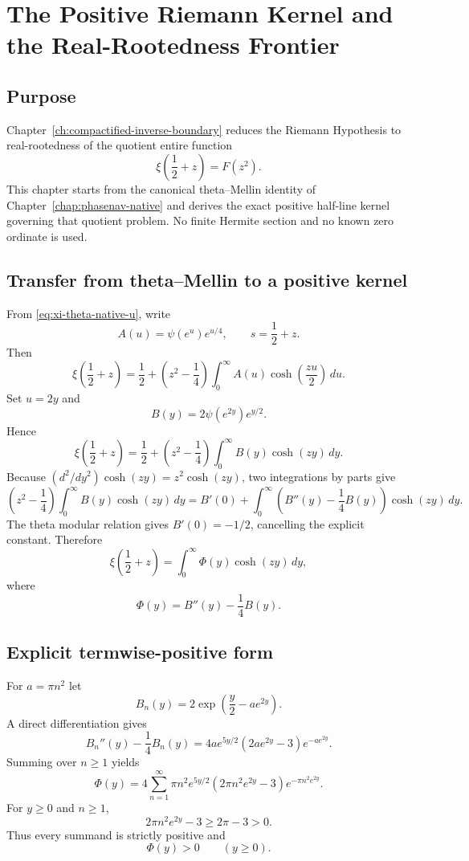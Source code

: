 \chapter{The Positive Riemann Kernel and the Real-Rootedness Frontier}
\label{chap:positive-riemann-kernel}


\section{Purpose}

Chapter~\ref{ch:compactified-inverse-boundary} reduces the Riemann Hypothesis to real-rootedness of the quotient entire function
\[
 \xi\!\left(\frac12+z\right)=F(z^2).
\]
This chapter starts from the canonical theta--Mellin identity of Chapter~\ref{chap:phasenav-native} and derives the exact positive half-line kernel governing that quotient problem. No finite Hermite section and no known zero ordinate is used.

\section{Transfer from theta--Mellin to a positive kernel}

From \cref{eq:xi-theta-native-u}, write
\[
 A(u)=\psi(e^u)e^{u/4},
 \qquad s=\frac12+z.
\]
Then
\[
 \xi\!\left(\frac12+z\right)
 =\frac12+\left(z^2-\frac14\right)
 \int_0^\infty A(u)\cosh\!\left(\frac{zu}{2}\right)\,du.
\]
Set $u=2y$ and
\[
 B(y)=2\psi(e^{2y})e^{y/2}.
\]
Hence
\[
 \xi\!\left(\frac12+z\right)
 =\frac12+\left(z^2-\frac14\right)
 \int_0^\infty B(y)\cosh(zy)\,dy.
\]
Because $(d^2/dy^2)\cosh(zy)=z^2\cosh(zy)$, two integrations by parts give
\[
 \left(z^2-\frac14\right)
 \int_0^\infty B(y)\cosh(zy)\,dy
 =B'(0)+\int_0^\infty
 \left(B''(y)-\frac14B(y)\right)\cosh(zy)\,dy.
\]
The theta modular relation gives $B'(0)=-1/2$, cancelling the explicit constant. Therefore
\begin{equation}
 \boxed{
 \xi\!\left(\frac12+z\right)
 =\int_0^\infty \Phi(y)\cosh(zy)\,dy,
 }
 \label{eq:positive-riemann-kernel}
\end{equation}
where
\[
 \Phi(y)=B''(y)-\frac14B(y).
\]

\section{Explicit termwise-positive form}

For $a=\pi n^2$ let
\[
 B_n(y)=2\exp\!\left(\frac y2-ae^{2y}\right).
\]
A direct differentiation gives
\[
 B_n''(y)-\frac14B_n(y)
 =4a e^{5y/2}\left(2ae^{2y}-3\right)e^{-ae^{2y}}.
\]
Summing over $n\ge1$ yields
\begin{equation}
 \boxed{
 \Phi(y)=4\sum_{n=1}^{\infty}
 \pi n^2e^{5y/2}
 \left(2\pi n^2e^{2y}-3\right)
 e^{-\pi n^2e^{2y}}.
 }
 \label{eq:explicit-positive-riemann-kernel}
\end{equation}
For $y\ge0$ and $n\ge1$,
\[
 2\pi n^2e^{2y}-3\ge2\pi-3>0.
\]
Thus every summand is strictly positive and
\begin{equation}
 \boxed{\Phi(y)>0\qquad(y\ge0).}
 \label{eq:riemann-kernel-positive}
\end{equation}

